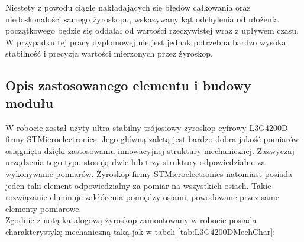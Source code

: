 Niestety z powodu ciągle nakładających się błędów całkowania oraz niedoskonałości samego żyroskopu, wskazywany kąt odchylenia od ułożenia początkowego będzie się oddalał od wartości rzeczywistej wraz z upływem czasu. W przypadku tej pracy dyplomowej nie jest jednak potrzebna bardzo wysoka stabilność i precyzja wartości mierzonych przez żyroskop.

\subsection{Opis zastosowanego elementu i budowy modułu}
W robocie został użyty ultra-stabilny trójosiowy żyroskop cyfrowy L3G4200D firmy STMicroelectronics. Jego główną zaletą jest bardzo dobra jakość pomiarów osiągnięta dzięki zastosowaniu innowacyjnej struktury mechanicznej. Zazwyczaj urządzenia tego typu stosują dwie lub trzy struktury odpowiedzialne za wykonywanie pomiarów. Żyroskop firmy STMicroelectronics natomiast posiada jeden taki element odpowiedzialny za pomiar na wszystkich osiach. Takie rozwiązanie eliminuje zakłócenia pomiędzy osiami, powodowane przez same elementy pomiarowe.
\\
Zgodnie z notą katalogową\cite{L3G4200DDataSheet} żyroskop zamontowany w robocie posiada charakterystykę mechaniczną taką jak w tabeli \ref{tab:L3G4200DMechChar}:

